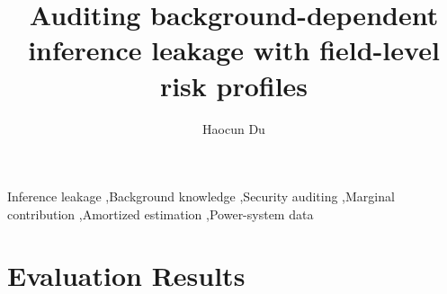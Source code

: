 \documentclass[preprint,11pt,a4paper]{elsarticle}
\begin{document}
\begin{frontmatter}
\title{Auditing background-dependent inference leakage with field-level risk profiles}
\author{Haocun Du}

\begin{keyword}
Inference leakage \sep Background knowledge \sep Security auditing \sep Marginal contribution \sep Amortized estimation \sep Power-system data
\end{keyword}
\end{frontmatter}





\section{Evaluation Results}\label{sec:results}







\FloatBarrier


\FloatBarrier
\appendix

\FloatBarrier


\end{document}
